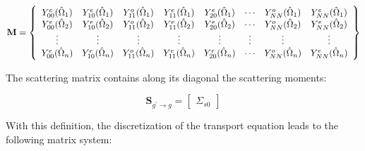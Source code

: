 \documentclass[10pt]{article}
\begin{document}
\begin{flushleft}
\begin{equation}
\textbf{M}=\left\{
\begin{array}{*{13}c}
Y_{00}^e(\hat{\Omega}_1)  & Y_{10}^e(\hat{\Omega}_1) & Y_{11}^o(\hat{\Omega}_1) & Y_{11}^e(\hat{\Omega}_1) & Y_{20}^e(\hat{\Omega}_1) & \cdots & Y_{NN}^o(\hat{\Omega}_1) & Y_{NN}^e(\hat{\Omega}_1)\\
Y_{00}^e(\hat{\Omega}_2)  & Y_{10}^e(\hat{\Omega}_2) & Y_{11}^o(\hat{\Omega}_2) & Y_{11}^e(\hat{\Omega}_2) & Y_{20}^e(\hat{\Omega}_2) & \cdots & Y_{NN}^o(\hat{\Omega}_2) & Y_{NN}^e(\hat{\Omega}_2)\\
\vdots & \vdots & \vdots & \vdots & \vdots & \vdots & \vdots & \vdots \\
Y_{00}^e(\hat{\Omega}_n) & Y_{10}^e(\hat{\Omega}_n) & Y_{11}^o(\hat{\Omega}_n) & Y_{11}^e(\hat{\Omega}_n) & Y_{20}^e(\hat{\Omega}_n) & \cdots & Y_{NN}^o(\hat{\Omega}_n) & Y_{NN}^e(\hat{\Omega}_n)\\
\end{array}\right\}
\end{equation}

The scattering matrix contains along its diagonal the scattering moments:

\begin{equation}
\textbf{S}_{g^{'}\rightarrow g}=\begin{bmatrix}
\Sigma_{s0}
\end{bmatrix}
\end{equation}

With this definition, the discretization of the transport equation leads to the following matrix system:


\end{flushleft}
\end{document}
